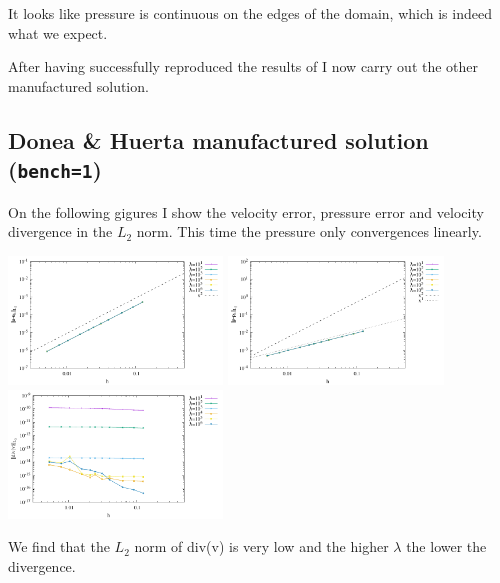 It looks like pressure is continuous on the edges of the domain, 
which is indeed what we expect.

After having successfully reproduced the results of \textcite{huzh11}
I now carry out the other manufactured solution.

\subsection*{Donea \& Huerta manufactured solution ({\tt bench=1})}

On the following gigures I show the velocity error, pressure error and velocity 
divergence in the $L_2$ norm.
This time the pressure only convergences linearly.

\begin{center}
\includegraphics[width=5.7cm]{python_codes/fieldstone_161/results/bench1/errorsV.pdf}
\includegraphics[width=5.7cm]{python_codes/fieldstone_161/results/bench1/errorsP.pdf}
\includegraphics[width=5.7cm]{python_codes/fieldstone_161/results/bench1/errorsDivv.pdf}
\end{center}

We find that the $L_2$ norm of div(v) is very low and the higher $\lambda$ the lower 
the divergence.


